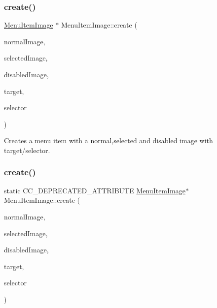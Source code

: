 \subsubsection{\texorpdfstring{create()}{create()}\hspace{0.1cm}{\footnotesize\ttfamily [11/14]}}
{\footnotesize\ttfamily \hyperlink{classMenuItemImage}{Menu\+Item\+Image} $\ast$ Menu\+Item\+Image\+::create (\begin{DoxyParamCaption}\item[{const std\+::string \&}]{normal\+Image,  }\item[{const std\+::string \&}]{selected\+Image,  }\item[{const std\+::string \&}]{disabled\+Image,  }\item[{\hyperlink{classRef}{Ref} $\ast$}]{target,  }\item[{S\+E\+L\+\_\+\+Menu\+Handler}]{selector }\end{DoxyParamCaption})\hspace{0.3cm}{\ttfamily [static]}}

Creates a menu item with a normal,selected and disabled image with target/selector. \mbox{\label{classMenuItemImage_a7f73a04161580bced4860e557bc4be99}} 
\subsubsection{\texorpdfstring{create()}{create()}\hspace{0.1cm}{\footnotesize\ttfamily [12/14]}}
{\footnotesize\ttfamily static C\+C\+\_\+\+D\+E\+P\+R\+E\+C\+A\+T\+E\+D\+\_\+\+A\+T\+T\+R\+I\+B\+U\+TE \hyperlink{classMenuItemImage}{Menu\+Item\+Image}$\ast$ Menu\+Item\+Image\+::create (\begin{DoxyParamCaption}\item[{const std\+::string \&}]{normal\+Image,  }\item[{const std\+::string \&}]{selected\+Image,  }\item[{const std\+::string \&}]{disabled\+Image,  }\item[{\hyperlink{classRef}{Ref} $\ast$}]{target,  }\item[{S\+E\+L\+\_\+\+Menu\+Handler}]{selector }\end{DoxyParamCaption})\hspace{0.3cm}{\ttfamily [static]}}

